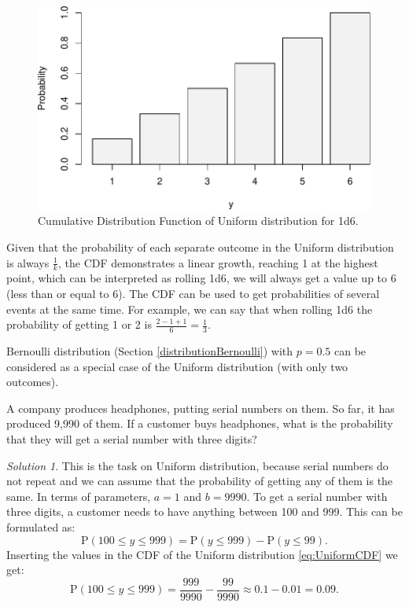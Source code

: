 \documentclass[
]{book}
\theoremstyle{definition}
\theoremstyle{definition}
\theoremstyle{definition}
\theoremstyle{definition}
\theoremstyle{remark}
\newtheorem*{solution}{Solution}
\begin{document}
\begin{figure}
\centering
\includegraphics{Svetunkov---Statistics-for-Business-Analytics_files/figure-latex/uniformCDF-1.pdf}
\caption{\label{fig:uniformCDF}Cumulative Distribution Function of Uniform distribution for 1d6.}
\end{figure}

Given that the probability of each separate outcome in the Uniform distribution is always \(\frac{1}{k}\), the CDF demonstrates a linear growth, reaching 1 at the highest point, which can be interpreted as rolling 1d6, we will always get a value up to 6 (less than or equal to 6). The CDF can be used to get probabilities of several events at the same time. For example, we can say that when rolling 1d6 the probability of getting 1 or 2 is \(\frac{2-1+1}{6}=\frac{1}{3}\).

Bernoulli distribution (Section \ref{distributionBernoulli}) with \(p=0.5\) can be considered as a special case of the Uniform distribution (with only two outcomes).

A company produces headphones, putting serial numbers on them. So far, it has produced 9,990 of them. If a customer buys headphones, what is the probability that they will get a serial number with three digits?

\begin{solution}
This is the task on Uniform distribution, because serial numbers do not repeat and we can assume that the probability of getting any of them is the same. In terms of parameters, \(a=1\) and \(b=9990\). To get a serial number with three digits, a customer needs to have anything between 100 and 999. This can be formulated as:
\begin{equation*}
    \mathrm{P}(100 \leq y \leq 999) = \mathrm{P}(y \leq 999) - \mathrm{P}(y \leq 99).
\end{equation*}
Inserting the values in the CDF of the Uniform distribution \eqref{eq:UniformCDF} we get:
\begin{equation*}
    \mathrm{P}(100 \leq y \leq 999) = \frac{999}{9990} - \frac{99}{9990} \approx 0.1 - 0.01 = 0.09.
\end{equation*}
\end{solution}
\end{document}
